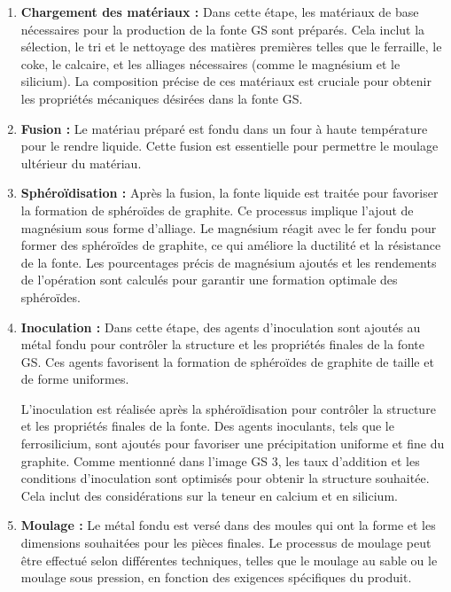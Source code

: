 \documentclass[12pt]{article}
\begin{document}
\begin{enumerate}
    \item \textbf{Chargement des matériaux :}
    Dans cette étape, les matériaux de base nécessaires pour la production de la 
    fonte GS sont préparés. Cela inclut la sélection, le tri et le nettoyage des 
    matières premières telles que le ferraille, le coke, le calcaire, et les alliages
    nécessaires (comme le magnésium et le silicium). La composition précise de ces 
    matériaux est cruciale pour obtenir les propriétés mécaniques désirées dans la 
    fonte GS.
    \item \textbf{Fusion :} Le matériau préparé est fondu dans un four à haute 
    température pour le rendre liquide. Cette fusion est essentielle pour permettre 
    le moulage ultérieur du matériau.
    \item \textbf{Sphéroïdisation :} Après la fusion, la fonte liquide est traitée 
    pour favoriser la formation de sphéroïdes de graphite. Ce processus implique 
    l'ajout de magnésium sous forme d'alliage. Le magnésium réagit avec le fer fondu 
    pour former des sphéroïdes de graphite, ce qui améliore la ductilité et la 
    résistance de la fonte. Les pourcentages précis de magnésium ajoutés et les 
    rendements de l'opération sont calculés pour garantir une formation optimale 
    des sphéroïdes.
    \item \textbf{Inoculation :} Dans cette étape, des agents d'inoculation sont 
    ajoutés au métal fondu pour contrôler la structure et les propriétés finales de 
    la fonte GS. Ces agents favorisent la formation de sphéroïdes de graphite de 
    taille et de forme uniformes.

    L'inoculation est réalisée après la sphéroïdisation pour contrôler la structure 
    et les propriétés finales de la fonte. Des agents inoculants, tels que le 
    ferrosilicium, sont ajoutés pour favoriser une précipitation uniforme et fine 
    du graphite. Comme mentionné dans l'image GS 3, les taux d'addition et les 
    conditions d'inoculation sont optimisés pour obtenir la structure souhaitée. 
    Cela inclut des considérations sur la teneur en calcium et en silicium.

    \item \textbf{Moulage :} Le métal fondu est versé dans des moules qui ont la 
    forme et les dimensions souhaitées pour les pièces finales. Le processus de 
    moulage peut être effectué selon différentes techniques, telles que le moulage 
    au sable ou le moulage sous pression, en fonction des exigences spécifiques du 
    produit.
    

\end{enumerate}
\end{document}
